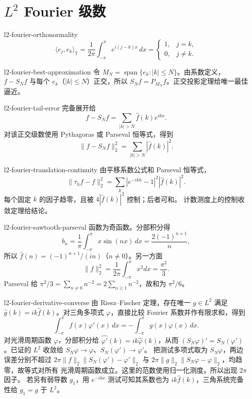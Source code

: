 \chapter{\texorpdfstring{\(L^2\)}{L2} Fourier 级数}

\begin{solution}{l2-fourier-orthonormality}
\[
 \langle e_j,e_k\rangle_{\mathbb T}
 =\frac1{2\pi}\int_{-\pi}^{\pi}e^{i(j-k)x}\,dx
 =\begin{cases}1,&j=k,\\0,&j\ne k.\end{cases}
\]
\end{solution}

\begin{solution}{l2-fourier-best-approximation}
令 \(M_N=\operatorname{span}\{e_k:|k|\le N\}\)。由系数定义，
\(f-S_Nf\) 与每个 \(e_k\)（\(|k|\le N\)）正交，所以
\(S_Nf=P_{M_N}f\)。正交投影定理给唯一最佳逼近。
\end{solution}

\begin{solution}{l2-fourier-tail-error}
完备展开给
\[
 f-S_Nf=\sum_{|k|>N}\widehat f(k)e^{ikx}.
\]
对该正交级数使用 Pythagoras 或 Parseval 恒等式，得到
\[
 \|f-S_Nf\|_2^2
 =\sum_{|k|>N}|\widehat f(k)|^2.
\]
\end{solution}

\begin{solution}{l2-fourier-translation-continuity}
由平移系数公式和 Parseval 恒等式，
\[
 \|\tau_hf-f\|_2^2
 =\sum_k|e^{-ikh}-1|^2|\widehat f(k)|^2.
\]
每个固定 \(k\) 的因子趋零，且被 \(4|\widehat f(k)|^2\) 控制；后者可和。
计数测度上的控制收敛定理给结论。
\end{solution}

\begin{solution}{l2-fourier-sawtooth-parseval}
函数为奇函数。分部积分得
\[
 b_n=\frac1\pi\int_{-\pi}^{\pi}x\sin(nx)\,dx
 =\frac{2(-1)^{n+1}}n,
\]
所以 \(\widehat f(n)=(-1)^{n+1}/(in)\)（\(n\ne0\)）。另一方面
\[
 \|f\|_2^2=\frac1{2\pi}\int_{-\pi}^{\pi}x^2dx=\frac{\pi^2}{3}.
\]
Parseval 给
\(\pi^2/3=\sum_{n\ne0}n^{-2}=2\sum_{n\ge1}n^{-2}\)，故和为
\(\pi^2/6\)。
\end{solution}

\begin{solution}{l2-fourier-derivative-converse}
由 Riesz--Fischer 定理，存在唯一 \(g\in L^2\) 满足
\(\widehat g(k)=ik\widehat f(k)\)。对三角多项式 \(\varphi\)，直接比较
Fourier 系数并作有限求和，得到
\[
 \int_{-\pi}^{\pi}f(x)\varphi'(x)\,dx
 =-\int_{-\pi}^{\pi}g(x)\varphi(x)\,dx.
\]
对光滑周期函数 \(\varphi\)，分部积分给
\(\widehat{\varphi'}(k)=ik\widehat\varphi(k)\)，从而
\((S_N\varphi)'=S_N(\varphi')\)。已证的 \(L^2\) 收敛给
\(S_N\varphi\to\varphi\)、\(S_N(\varphi')\to\varphi'\)。
把测试多项式取为 \(S_N\varphi\)，两边误差分别不超过
\(2\pi\|f\|_2\|S_N(\varphi')-\varphi'\|_2\) 与
\(2\pi\|g\|_2\|S_N\varphi-\varphi\|_2\)，均趋零，故等式对所有
光滑周期函数成立。这里的范数使用归一化测度，所以出现 \(2\pi\) 因子。
若另有弱导数 \(g_1\)，用 \(e^{-ikx}\) 测试可知其系数也为
\(ik\widehat f(k)\)，三角系统完备性给 \(g_1=g\) 于 \(L^2\)。
\end{solution}

